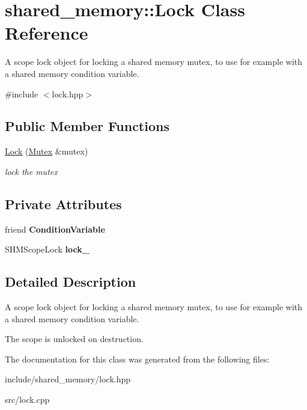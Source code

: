 \hypertarget{classshared__memory_1_1Lock}{}\section{shared\+\_\+memory\+:\+:Lock Class Reference}
\label{classshared__memory_1_1Lock}


A scope lock object for locking a shared memory mutex, to use for example with a shared memory condition variable.  




{\ttfamily \#include $<$lock.\+hpp$>$}

\subsection*{Public Member Functions}
\begin{DoxyCompactItemize}
\item 
\hyperlink{classshared__memory_1_1Lock_aacd7b7ee828e6a83bf18497ea7e33d70}{Lock} (\hyperlink{classshared__memory_1_1Mutex}{Mutex} \&mutex)\hypertarget{classshared__memory_1_1Lock_aacd7b7ee828e6a83bf18497ea7e33d70}{}\label{classshared__memory_1_1Lock_aacd7b7ee828e6a83bf18497ea7e33d70}

\begin{DoxyCompactList}\small\item\em lock the mutex \end{DoxyCompactList}\end{DoxyCompactItemize}
\subsection*{Private Attributes}
\begin{DoxyCompactItemize}
\item 
friend {\bfseries Condition\+Variable}\hypertarget{classshared__memory_1_1Lock_ab376f06fa4c31a6b2352f307f2bfe007}{}\label{classshared__memory_1_1Lock_ab376f06fa4c31a6b2352f307f2bfe007}

\item 
S\+H\+M\+Scope\+Lock {\bfseries lock\+\_\+}\hypertarget{classshared__memory_1_1Lock_aa97f73af624861f63cb827b8f8a082f2}{}\label{classshared__memory_1_1Lock_aa97f73af624861f63cb827b8f8a082f2}

\end{DoxyCompactItemize}


\subsection{Detailed Description}
A scope lock object for locking a shared memory mutex, to use for example with a shared memory condition variable. 

The scope is unlocked on destruction. 

The documentation for this class was generated from the following files\+:\begin{DoxyCompactItemize}
\item 
include/shared\+\_\+memory/lock.\+hpp\item 
src/lock.\+cpp\end{DoxyCompactItemize}
